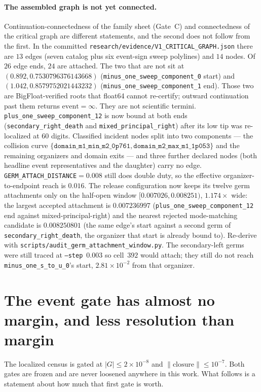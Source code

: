 \documentclass[11pt]{article}
\begin{document}
\paragraph{The assembled graph is not yet connected.}
Continuation-connectedness of the family sheet (Gate~C) and connectedness of
the critical graph are different statements, and the second does not follow from
the first.  In the committed
\texttt{research/evidence/V1\_CRITICAL\_GRAPH.json} there are $13$ edges
(seven catalog plus six event-sign sweep polylines) and $14$ nodes.
Of $26$ edge ends, $24$ are attached.
The two that are not sit at
$(0.892,0.7530796376143668)$
(\texttt{minus\_one\_sweep\_component\_0} start) and
$(1.042,0.8579752021443232)$
(\texttt{minus\_one\_sweep\_component\_1} end).
Those two are BigFloat-verified roots that float64 cannot re-certify;
outward continuation past them returns $\mathrm{event}=\infty$.
They are not scientific termini.
\texttt{plus\_one\_sweep\_component\_12} is now bound at both ends
(\texttt{secondary\_right\_death} and \texttt{mixed\_principal\_right})
after its low tip was re-localized at $60$ digits.
Classified incident nodes split into two components --- the collision curve
$\{\texttt{domain\_m1\_min\_m2\_0p761},\texttt{domain\_m2\_max\_m1\_1p053}\}$
and the remaining organizers and domain exits --- and three further declared
nodes (both headline event representatives and the daughter) carry no edge.
\texttt{GERM\_ATTACH\_DISTANCE}$=0.008$ still does double duty, so the
effective organizer-to-endpoint reach is $0.016$.
The release configuration now keeps its twelve germ attachments only on the
half-open window $[0.007026,0.008251)$, $1.174\times$ wide: the largest
accepted attachment is $0.007236997$
(\texttt{plus\_one\_sweep\_component\_12} end against mixed-principal-right)
and the nearest rejected mode-matching candidate is $0.008250801$
(the same edge's start against a second germ of
\texttt{secondary\_right\_death}, the organizer that start is already bound
to).  Re-derive with \texttt{scripts/audit\_germ\_attachment\_window.py}.
The secondary-left germs were still traced at \texttt{--step}~$0.003$ so
cell~$392$ would attach; they still do not reach
\texttt{minus\_one\_s\_to\_u\_0}'s start, $2.81\times10^{-2}$ from that
organizer.
\section{The event gate has almost no margin, and less resolution than margin}
\label{sec:margin}

The localized census is gated at $|G|\le 2\times10^{-8}$ and $\|\text{closure}\|
\le 10^{-7}$.  Both gates are frozen and are never loosened anywhere in this
work.  What follows is a statement about how much that first gate is worth.
\end{document}
